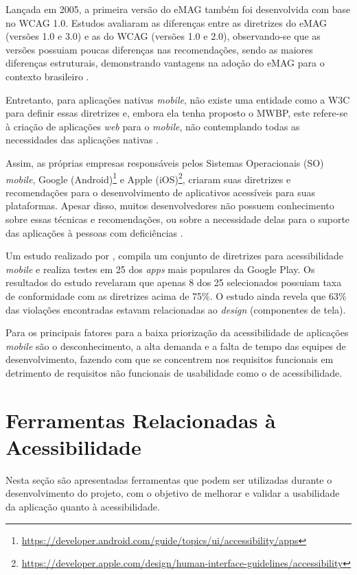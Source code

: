 Lançada em 2005, a primeira versão do eMAG também foi desenvolvida com base no WCAG 1.0. Estudos avaliaram as diferenças entre as diretrizes do eMAG
(versões 1.0 e 3.0) e as do WCAG (versões 1.0 e 2.0), observando-se que as versões possuiam poucas
diferenças nas recomendações, sendo as maiores diferenças estruturais, demonstrando vantagens na adoção do eMAG para o
contexto brasileiro \cite{Bach_2009,Rocha_2013}.

Entretanto, para aplicações nativas \textit{mobile}, não existe uma entidade como a W3C para definir essas diretrizes e, embora
ela tenha proposto o MWBP, este refere-se à criação de aplicações \emph{web} para o \emph{mobile}, não contemplando todas
as necessidades das aplicações nativas \cite{W3C_2008}.

Assim, as próprias empresas responsáveis pelos Sistemas Operacionais (SO) \emph{mobile}, Google (Android)\footnote{\url{https://developer.android.com/guide/topics/ui/accessibility/apps}}
e Apple (iOS)\footnote{\url{https://developer.apple.com/design/human-interface-guidelines/accessibility}},
criaram suas diretrizes e recomendações para o desenvolvimento de aplicativos acessíveis para suas plataformas.
Apesar disso, muitos desenvolvedores não possuem conhecimento sobre essas técnicas e recomendações, ou sobre a necessidade delas
para o suporte das aplicações à pessoas com deficiências \cite{Quispe2020,Bi2021}.

Um estudo realizado por , compila um conjunto de diretrizes para acessibilidade \textit{mobile} e realiza
testes em 25 dos \textit{apps} mais populares da Google Play. Os resultados do estudo revelaram que apenas 8 dos 25 selecionados
possuiam taxa de conformidade com as diretrizes acima de 75\%. O estudo ainda revela que 63\% das violações encontradas estavam
relacionadas ao \textit{design} (componentes de tela).

Para  os principais fatores para a baixa priorização da acessibilidade de aplicações \textit{mobile}
são o desconhecimento, a alta demanda e a falta de tempo das equipes de desenvolvimento, fazendo com que se concentrem nos
requisitos funcionais em detrimento de requisitos não funcionais de usabilidade como o de acessibilidade.

\section{Ferramentas Relacionadas à Acessibilidade}
Nesta seção são apresentadas ferramentas que podem ser utilizadas durante o desenvolvimento do projeto, com o objetivo de melhorar e validar a usabilidade
da aplicação quanto à acessibilidade.

